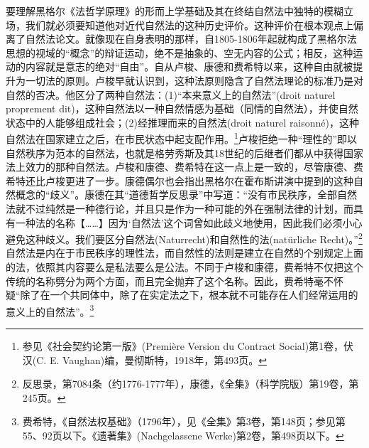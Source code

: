 要理解黑格尔《法哲学原理》的形而上学基础及其在终结自然法中独特的模糊立场，我们就必须要知道他对近代自然法的这种历史评价。这种评价在根本观点上偏离了自然法论文。就像现在自身表明的那样，自1805-1806年起就构成了黑格尔法思想的视域的“概念”的辩证运动，绝不是抽象的、空无内容的公式；相反，这种运动的内容就是意志的绝对“自由”。自从卢梭、康德和费希特以来，这种自由就被提升为一切法的原则。卢梭早就认识到，这种法原则隐含了自然法理论的标准乃是对自然的否决。他区分了两种自然法：(1)“本来意义上的自然法”(droit naturel proprement dit)，这种自然法以一种自然情感为基础（同情的自然法），并使自然状态中的人能够组成社会；(2)经推理而来的自然法(droit naturel raisonné)，这种自然法在国家建立之后，在市民状态中起支配作用。\footnote{参见《社会契约论第一版》(Première Version du Contract Social)第1卷，伏汉(C. E. Vaughan)编，曼彻斯特，1918年，第493页。}卢梭拒绝一种“理性的”即以自然秩序为范本的自然法，也就是格劳秀斯及其18世纪的后继者们都从中获得国家法上效力的那种自然法。卢梭和康德、费希特在这一点上是一致的，尽管康德、费希特还比卢梭更进了一步。康德偶尔也会指出黑格尔在霍布斯讲演中提到的这种自然概念的“歧义”。康德在其“道德哲学反思录”中写道：“没有市民秩序，全部自然法就不过纯然是一种德行论，并且只是作为一种可能的外在强制法律的计划，而具有一种法的名称【……】因为‘自然法’这个词曾如此歧义地使用，因此我们必须小心避免这种歧义。我们要区分自然法(Naturrecht)和自然性的法(natürliche Recht)。”\footnote{反思录，第7084条（约1776-1777年），康德，《全集》（科学院版）第19卷，第245页。}自然法是内在于市民秩序的理性法，而自然性的法则是建立在自然的个别规定上面的法，依照其内容要么是私法要么是公法。不同于卢梭和康德，费希特不仅把这个传统的名称劈分为两个方面，而且完全抛弃了这个名称。因此，费希特毫不怀疑“除了在一个共同体中，除了在实定法之下，根本就不可能存在人们经常运用的意义上的自然法”。\footnote{费希特，《自然法权基础》（1796年），见《全集》第3卷，第148页；参见第55、92页以下。《遗著集》(Nachgelassene Werke)第2卷，第498页以下。}

